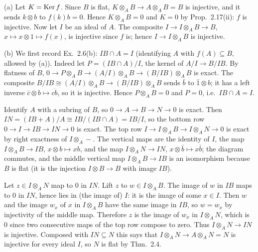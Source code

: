 \documentclass[11pt]{article}
\begin{document}
\pf
(a) Let $K=\operatorname{Ker} f$. Since $B$ is flat, $K\otimes_AB\to A\otimes_AB=B$ is injective, and it sends $k\otimes b$ to $f(k)b=0$. Hence $K\otimes_AB=0$ and $K=0$ by Prop.~2.17(ii): $f$ is injective. Now let $I$ be an ideal of $A$. The composite $I\to I\otimes_AB\to B$, $x\mapsto x\otimes1\mapsto f(x)$, is injective since $f$ is; hence $I\to I\otimes_AB$ is injective.

(b) We first record Ex.~2.6(b): $IB\cap A=I$ (identifying $A$ with $f(A)\subseteq B$, allowed by (a)). Indeed let $P=(IB\cap A)/I$, the kernel of $A/I\to B/IB$. By flatness of $B$, $0\to P\otimes_AB\to (A/I)\otimes_AB\to (B/IB)\otimes_AB$ is exact. The composite $B/IB\cong (A/I)\otimes_AB\to(B/IB)\otimes_AB$ sends $\bar b$ to $\bar1\otimes b$; it has a left inverse $\bar c\otimes b\mapsto\overline{cb}$, so it is injective. Hence $P\otimes_AB=0$ and $P=0$, i.e.\ $IB\cap A=I$.

Identify $A$ with a subring of $B$, so $0\to A\to B\to N\to0$ is exact. Then $IN=(IB+A)/A\cong IB/(IB\cap A)=IB/I$, so the bottom row $0\to I\to IB\to IN\to0$ is exact. The top row $I\to I\otimes_AB\to I\otimes_AN\to0$ is exact by right exactness of $I\otimes_A-$. The vertical maps are the identity of $I$, the map $I\otimes_AB\to IB$, $x\otimes b\mapsto xb$, and the map $I\otimes_AN\to IN$, $x\otimes\bar b\mapsto x\bar b$; the diagram commutes, and the middle vertical map $I\otimes_AB\to IB$ is an isomorphism because $B$ is flat (it is the injection $I\otimes B\to B$ with image $IB$).

Let $z\in I\otimes_AN$ map to $0$ in $IN$. Lift $z$ to $w\in I\otimes_AB$. The image of $w$ in $IB$ maps to $0$ in $IN$, hence lies in (the image of) $I$: it is the image of some $x\in I$. Then $w$ and the image $w_x$ of $x$ in $I\otimes_AB$ have the same image in $IB$, so $w=w_x$ by injectivity of the middle map. Therefore $z$ is the image of $w_x$ in $I\otimes_AN$, which is $0$ since two consecutive maps of the top row compose to zero. Thus $I\otimes_AN\to IN$ is injective. Composed with $IN\subseteq N$ this says that $I\otimes_AN\to A\otimes_AN=N$ is injective for every ideal $I$, so $N$ is flat by Thm.~2.4.
\end{document}
